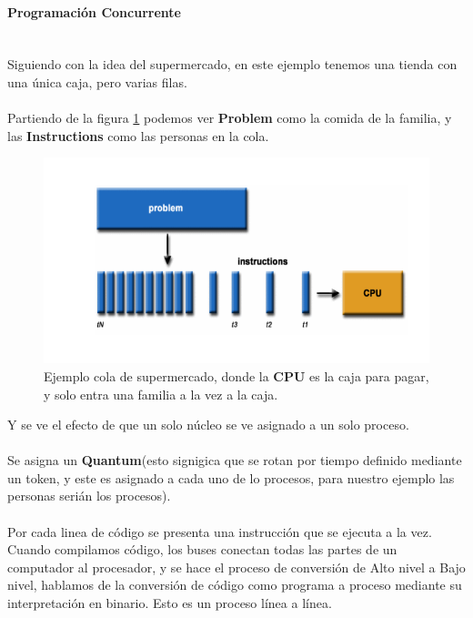 \documentclass[a4paper]{report} %
\begin{document}
            \paragraph{Programación Concurrente}\mbox{} \\
              Siguiendo con la idea del supermercado, en este ejemplo tenemos una tienda con una única caja, pero varias filas.
              \\\\Partiendo de la figura \ref{fig2:paralelo-ej2} podemos ver \textbf {Problem} como la comida de la familia, y las \textbf{Instructions} como las personas en la cola.
                \begin{figure}[htb]
                \centering
                  \includegraphics[width=\textwidth]{Images/Paralelo-ej2.png}
                  \caption{Ejemplo cola de supermercado, donde la \textbf{CPU} es la caja para pagar, y solo entra una familia a la vez a la caja.}
                  \label{fig2:paralelo-ej2}
              \end{figure}
              Y se ve el efecto de que un solo núcleo se ve asignado a un solo proceso.
              \\\\Se asigna un \textbf{Quantum}(esto signigica que se rotan por tiempo definido mediante un token, y este es asignado a cada uno de lo procesos, para nuestro ejemplo las personas serián los procesos).
            \\\\Por cada linea de código se presenta una instrucción que se ejecuta a la vez.
            \\Cuando compilamos código, los buses conectan todas las partes de un computador al procesador, y se hace el proceso de conversión de Alto nivel a Bajo nivel, hablamos de la conversión de código como programa a proceso mediante su interpretación en binario. Esto es un proceso línea a línea.
\end{document}
